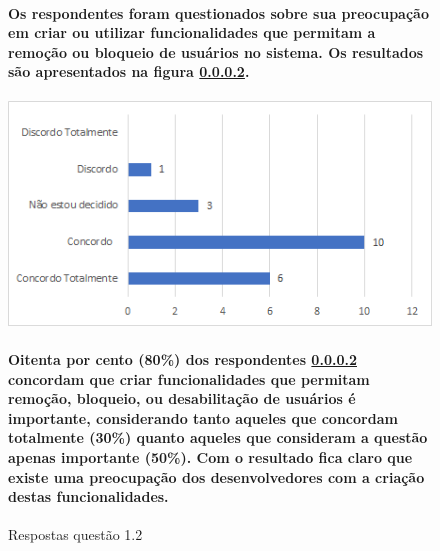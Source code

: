 \begin{figure}[!t]
\centering
\paragraph{Os respondentes foram questionados sobre sua preocupação em criar ou utilizar funcionalidades que permitam a remoção ou bloqueio de usuários no sistema. Os resultados são apresentados na figura \ref{fig:1.2}.}
\includegraphics[scale=0.8]{figuras das questoes/1.2.PNG}
\caption{Respostas questão 1.2}

\paragraph{
Oitenta por cento (80{\%}) dos respondentes \ref{fig:1.2} concordam que criar funcionalidades que permitam remoção, bloqueio, ou desabilitação de usuários é importante, considerando tanto aqueles que concordam totalmente (30{\%}) quanto aqueles que consideram a questão apenas importante (50{\%}). Com o resultado fica claro que existe uma preocupação dos desenvolvedores com a criação destas funcionalidades.
}
\label{fig:1.2}
\end{figure}
